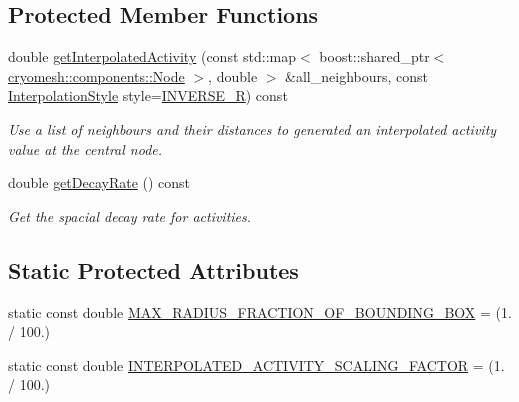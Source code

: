 \subsection*{\-Protected \-Member \-Functions}
\begin{DoxyCompactItemize}
\item 
double \hyperlink{classcryomesh_1_1structures_1_1NodeMesh_a518d312139ab92f1251cd387304e60fd}{get\-Interpolated\-Activity} (const std\-::map$<$ boost\-::shared\-\_\-ptr$<$ \hyperlink{classcryomesh_1_1components_1_1Node}{cryomesh\-::components\-::\-Node} $>$, double $>$ \&all\-\_\-neighbours, const \hyperlink{classcryomesh_1_1structures_1_1NodeMesh_a2abd31c9553e8eea47b2f48f4128baa1}{\-Interpolation\-Style} style=\hyperlink{classcryomesh_1_1structures_1_1NodeMesh_a2abd31c9553e8eea47b2f48f4128baa1a9c19702f5ebbdb27e8c729ea80ed4092}{\-I\-N\-V\-E\-R\-S\-E\-\_\-\-R}) const 
\begin{DoxyCompactList}\small\item\em \-Use a list of neighbours and their distances to generated an interpolated activity value at the central node. \end{DoxyCompactList}\item 
double \hyperlink{classcryomesh_1_1structures_1_1NodeMesh_a3f12c3d9d3a69a6edf1e04d37041af23}{get\-Decay\-Rate} () const 
\begin{DoxyCompactList}\small\item\em \-Get the spacial decay rate for activities. \end{DoxyCompactList}\end{DoxyCompactItemize}
\subsection*{\-Static \-Protected \-Attributes}
\begin{DoxyCompactItemize}
\item 
static const double \hyperlink{classcryomesh_1_1structures_1_1NodeMesh_aede40ee5229b60fb8d2e516435e73027}{\-M\-A\-X\-\_\-\-R\-A\-D\-I\-U\-S\-\_\-\-F\-R\-A\-C\-T\-I\-O\-N\-\_\-\-O\-F\-\_\-\-B\-O\-U\-N\-D\-I\-N\-G\-\_\-\-B\-O\-X} = (1. / 100.)
\item 
static const double \hyperlink{classcryomesh_1_1structures_1_1NodeMesh_aabeafa7c3195b23a5505b9a4b1feb99d}{\-I\-N\-T\-E\-R\-P\-O\-L\-A\-T\-E\-D\-\_\-\-A\-C\-T\-I\-V\-I\-T\-Y\-\_\-\-S\-C\-A\-L\-I\-N\-G\-\_\-\-F\-A\-C\-T\-O\-R} = (1. / 100.)
\end{DoxyCompactItemize}
